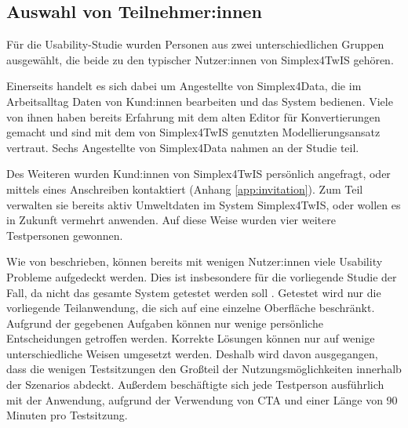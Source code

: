 \subsection{Auswahl von Teilnehmer:innen}

Für die Usability-Studie wurden Personen aus zwei unterschiedlichen Gruppen ausgewählt, die beide zu den typischer Nutzer:innen von Simplex4TwIS gehören.

Einerseits handelt es sich dabei um Angestellte von Simplex4Data, die im Arbeitsalltag Daten von Kund:innen bearbeiten und das System bedienen. Viele von ihnen haben bereits Erfahrung mit dem alten Editor für Konvertierungen gemacht und sind mit dem von Simplex4TwIS genutzten Modellierungsansatz vertraut. Sechs Angestellte von Simplex4Data nahmen an der Studie teil.

Des Weiteren wurden Kund:innen von Simplex4TwIS persönlich angefragt, oder mittels eines Anschreiben kontaktiert (Anhang \ref{app:invitation}). Zum Teil verwalten sie bereits aktiv Umweltdaten im System Simplex4TwIS, oder wollen es in Zukunft vermehrt anwenden. Auf diese Weise wurden vier weitere Testpersonen gewonnen.


Wie von \textcite{nielsenWhyYou2000} beschrieben, können bereits mit wenigen Nutzer:innen viele Usability Probleme aufgedeckt werden. Dies ist insbesondere für die vorliegende Studie der Fall, da nicht das gesamte System getestet werden soll \parencite[Vgl. \ref{sec:formative-summative}]{spoolTestingWeb2001}. Getestet wird nur die vorliegende Teilanwendung, die sich auf eine einzelne Oberfläche beschränkt. Aufgrund der gegebenen Aufgaben können nur wenige persönliche Entscheidungen getroffen werden. Korrekte Lösungen können nur auf wenige unterschiedliche Weisen umgesetzt werden. Deshalb wird davon ausgegangen, dass die wenigen Testsitzungen den Großteil der Nutzungsmöglichkeiten innerhalb der Szenarios abdeckt. Außerdem beschäftigte sich jede Testperson ausführlich mit der Anwendung, aufgrund der Verwendung von \ac{CTA} und einer Länge von 90 Minuten pro Testsitzung.
